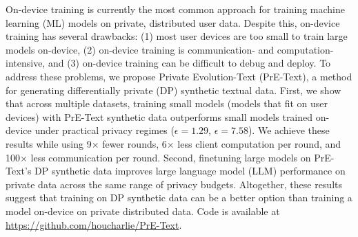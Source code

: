 On-device training is currently the most common approach for training machine learning (ML) models on private, distributed user data. Despite this, on-device training has several drawbacks:  (1) most user devices are too small to train large models on-device, (2) on-device training is communication- and computation-intensive, and (3) on-device training can be difficult to debug and deploy.
To address these problems, we propose Private Evolution-Text (PrE-Text), a method for generating differentially private (DP) synthetic textual data.  First, we show that across multiple datasets, training small models (models that fit on user devices) with PrE-Text synthetic data outperforms small models trained on-device under practical privacy regimes ($\epsilon=1.29$, $\epsilon=7.58$). We achieve these results while using  9$\times$ fewer rounds,  6$\times$ less client computation per round, and 100$\times$ less communication per round.
Second, finetuning large models on PrE-Text's DP synthetic data improves large language model (LLM) performance on private data across the same range of privacy budgets. Altogether, these results suggest that training on DP synthetic data can be a better option than training a model on-device on private distributed data. Code is available at \href{https://github.com/houcharlie/PrE-Text}{https://github.com/houcharlie/PrE-Text}.